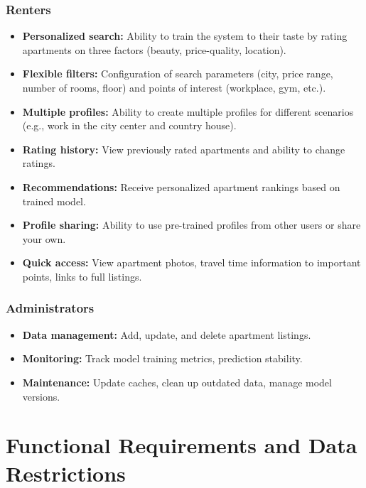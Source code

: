 \documentclass[12pt,a4paper]{article}
\begin{document}
\subsubsection{Renters}
\begin{itemize}
    \item \textbf{Personalized search:} Ability to train the system to their taste by rating apartments on three factors (beauty, price-quality, location).
    
    \item \textbf{Flexible filters:} Configuration of search parameters (city, price range, number of rooms, floor) and points of interest (workplace, gym, etc.).
    
    \item \textbf{Multiple profiles:} Ability to create multiple profiles for different scenarios (e.g., work in the city center and country house).
    
    \item \textbf{Rating history:} View previously rated apartments and ability to change ratings.
    
    \item \textbf{Recommendations:} Receive personalized apartment rankings based on trained model.
    
    \item \textbf{Profile sharing:} Ability to use pre-trained profiles from other users or share your own.
    
    \item \textbf{Quick access:} View apartment photos, travel time information to important points, links to full listings.
\end{itemize}

\subsubsection{Administrators}
\begin{itemize}
    \item \textbf{Data management:} Add, update, and delete apartment listings.
    
    \item \textbf{Monitoring:} Track model training metrics, prediction stability.
    
    \item \textbf{Maintenance:} Update caches, clean up outdated data, manage model versions.
\end{itemize}

\section{Functional Requirements and Data Restrictions}
\end{document}
